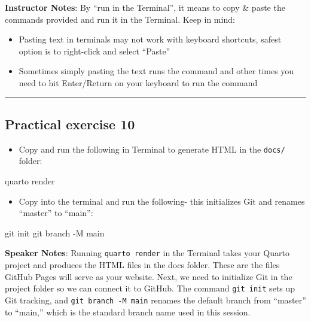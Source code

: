 \documentclass[
  letterpaper,
  DIV=11,
  numbers=noendperiod]{scrartcl}
\newenvironment{Shaded}{\begin{snugshade}}{\end{snugshade}}
\newcommand{\NormalTok}[1]{\textcolor[rgb]{0.00,0.23,0.31}{#1}}
\providecommand{\tightlist}{%
  \setlength{\itemsep}{0pt}\setlength{\parskip}{0pt}}
\begin{document}
\textbf{Instructor Notes}: By ``run in the Terminal'', it means to copy
\& paste the commands provided and run it in the Terminal. Keep in mind:

\begin{itemize}
\tightlist
\item
  Pasting text in terminals may not work with keyboard shortcuts, safest
  option is to right-click and select ``Paste''
\item
  Sometimes simply pasting the text runs the command and other times you
  need to hit Enter/Return on your keyboard to run the command
\end{itemize}

\begin{center}\rule{0.5\linewidth}{0.5pt}\end{center}

\subsection{Practical exercise 10}\label{practical-exercise-10-2}

\begin{itemize}
\tightlist
\item[$\square$]
  Copy and run the following in Terminal to generate HTML in the
  \texttt{docs/} folder:
\end{itemize}

\begin{Shaded}
\begin{Highlighting}[]
\NormalTok{quarto render}
\end{Highlighting}
\end{Shaded}

\begin{itemize}
\tightlist
\item[$\square$]
  Copy into the terminal and run the following- this initializes Git and
  renames ``master'' to ``main'':
\end{itemize}

\begin{Shaded}
\begin{Highlighting}[]
\NormalTok{git init}
\NormalTok{git branch {-}M main  }
\end{Highlighting}
\end{Shaded}

\textbf{Speaker Notes}: Running \texttt{quarto\ render} in the Terminal
takes your Quarto project and produces the HTML files in the docs
folder. These are the files GitHub Pages will serve as your website.
Next, we need to initialize Git in the project folder so we can connect
it to GitHub. The command \texttt{git\ init} sets up Git tracking, and
\texttt{git\ branch\ -M\ main} renames the default branch from
``master'' to ``main,'' which is the standard branch name used in this
session.
\end{document}

